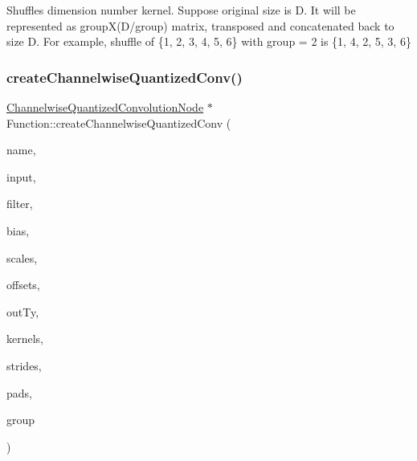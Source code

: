 Shuffles dimension number {\ttfamily kernel}. Suppose original size is D. It will be represented as groupX(D/group) matrix, transposed and concatenated back to size D. For example, shuffle of \{1, 2, 3, 4, 5, 6\} with {\ttfamily group} = 2 is \{1, 4, 2, 5, 3, 6\} \mbox{\label{classglow_1_1_function_a94c1fee1a3b4e7779c7a1cee21592f0f}} 
\subsubsection{\texorpdfstring{create\+Channelwise\+Quantized\+Conv()}{createChannelwiseQuantizedConv()}}
{\footnotesize\ttfamily \hyperlink{classglow_1_1_channelwise_quantized_convolution_node}{Channelwise\+Quantized\+Convolution\+Node} $\ast$ Function\+::create\+Channelwise\+Quantized\+Conv (\begin{DoxyParamCaption}\item[{llvm\+::\+String\+Ref}]{name,  }\item[{\hyperlink{structglow_1_1_node_value}{Node\+Value}}]{input,  }\item[{\hyperlink{classglow_1_1_constant}{Constant} $\ast$}]{filter,  }\item[{\hyperlink{classglow_1_1_constant}{Constant} $\ast$}]{bias,  }\item[{\hyperlink{classglow_1_1_constant}{Constant} $\ast$}]{scales,  }\item[{\hyperlink{classglow_1_1_constant}{Constant} $\ast$}]{offsets,  }\item[{\hyperlink{structglow_1_1_type}{Type\+Ref}}]{out\+Ty,  }\item[{llvm\+::\+Array\+Ref$<$ \hyperlink{namespaceglow_a0ca574644e1e42ef193a9947fb4d8911}{unsigned\+\_\+t} $>$}]{kernels,  }\item[{llvm\+::\+Array\+Ref$<$ \hyperlink{namespaceglow_a0ca574644e1e42ef193a9947fb4d8911}{unsigned\+\_\+t} $>$}]{strides,  }\item[{llvm\+::\+Array\+Ref$<$ \hyperlink{namespaceglow_a0ca574644e1e42ef193a9947fb4d8911}{unsigned\+\_\+t} $>$}]{pads,  }\item[{\hyperlink{namespaceglow_a0ca574644e1e42ef193a9947fb4d8911}{unsigned\+\_\+t}}]{group }\end{DoxyParamCaption})}

